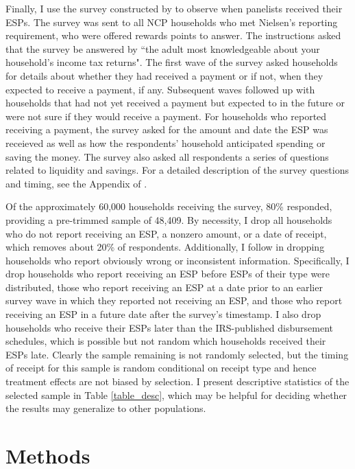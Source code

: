 \documentclass[12pt]{article}
\begin{document}
Finally, I use the survey constructed by \textcite{broda2014economic} to observe when panelists received their ESPs. The survey was sent to all NCP households who met Nielsen's reporting requirement, who were offered rewards points to answer. The instructions asked that the survey be answered by ``the adult most knowledgeable about your household's income tax returns". The first wave of the survey asked households for details about whether they had received a payment or if not, when they expected to receive a payment, if any. Subsequent waves followed up with households that had not yet received a payment but expected to in the future or were not sure if they would receive a payment. For households who reported receiving a payment, the survey asked for the amount and date the ESP was receieved as well as how the respondents' household anticipated spending or saving the money. The survey also asked all respondents a series of questions related to liquidity and savings. For a detailed description of the survey questions and timing, see the Appendix of \textcite{broda2014economic}.

Of the approximately 60,000 households receiving the survey, 80\% responded, providing a pre-trimmed sample of 48,409. By necessity, I drop all households who do not report receiving an ESP, a nonzero amount, or a date of receipt, which removes about 20\% of respondents. Additionally, I follow \textcite{broda2014economic} in dropping households who report obviously wrong or inconsistent information. Specifically, I drop households who report receiving an ESP before ESPs of their type were distributed, those who report receiving an ESP at a date prior to an earlier survey wave in which they reported not receiving an ESP, and those who report receiving an ESP in a future date after the survey's timestamp. I also drop households who receive their ESPs later than the IRS-published disbursement schedules, which is possible but not random which households received their ESPs late. Clearly the sample remaining is not randomly selected, but the timing of receipt for this sample is random conditional on receipt type and hence treatment effects are not biased by selection. I present descriptive statistics of the selected sample in Table \ref{table_desc}, which may be helpful for deciding whether the results may generalize to other populations.


\section{Methods} \label{methods}
\end{document}
